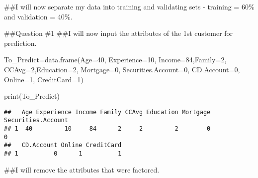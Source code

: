 \documentclass[
]{article}
\newenvironment{Shaded}{\begin{snugshade}}{\end{snugshade}}
\newcommand{\AttributeTok}[1]{\textcolor[rgb]{0.77,0.63,0.00}{#1}}
\newcommand{\ConstantTok}[1]{\textcolor[rgb]{0.00,0.00,0.00}{#1}}
\newcommand{\DecValTok}[1]{\textcolor[rgb]{0.00,0.00,0.81}{#1}}
\newcommand{\FloatTok}[1]{\textcolor[rgb]{0.00,0.00,0.81}{#1}}
\newcommand{\FunctionTok}[1]{\textcolor[rgb]{0.00,0.00,0.00}{#1}}
\newcommand{\NormalTok}[1]{#1}
\newcommand{\OtherTok}[1]{\textcolor[rgb]{0.56,0.35,0.01}{#1}}
\newcommand{\SpecialCharTok}[1]{\textcolor[rgb]{0.00,0.00,0.00}{#1}}
\begin{document}
\#\#I will now separate my data into training and validating sets -
training = 60\% and validation = 40\%.

\begin{Shaded}
\end{Shaded}

\#\#Question \#1 \#\#I will now input the attributes of the 1st customer
for prediction.

\begin{Shaded}
\begin{Highlighting}[]
\NormalTok{To\_Predict}\OtherTok{=}\FunctionTok{data.frame}\NormalTok{(}\AttributeTok{Age=}\DecValTok{40}\NormalTok{, }\AttributeTok{Experience=}\DecValTok{10}\NormalTok{,}
                      \AttributeTok{Income=}\DecValTok{84}\NormalTok{,}\AttributeTok{Family=}\DecValTok{2}\NormalTok{,}
                      \AttributeTok{CCAvg=}\DecValTok{2}\NormalTok{,}\AttributeTok{Education=}\DecValTok{2}\NormalTok{,}
                      \AttributeTok{Mortgage=}\DecValTok{0}\NormalTok{,}
                      \AttributeTok{Securities.Account=}\DecValTok{0}\NormalTok{,}
                      \AttributeTok{CD.Account=}\DecValTok{0}\NormalTok{,}
                      \AttributeTok{Online=}\DecValTok{1}\NormalTok{,}
                      \AttributeTok{CreditCard=}\DecValTok{1}\NormalTok{)}

\FunctionTok{print}\NormalTok{(To\_Predict)}
\end{Highlighting}
\end{Shaded}

\begin{verbatim}
##   Age Experience Income Family CCAvg Education Mortgage Securities.Account
## 1  40         10     84      2     2         2        0                  0
##   CD.Account Online CreditCard
## 1          0      1          1
\end{verbatim}

\#\#I will remove the attributes that were factored.
\end{document}
